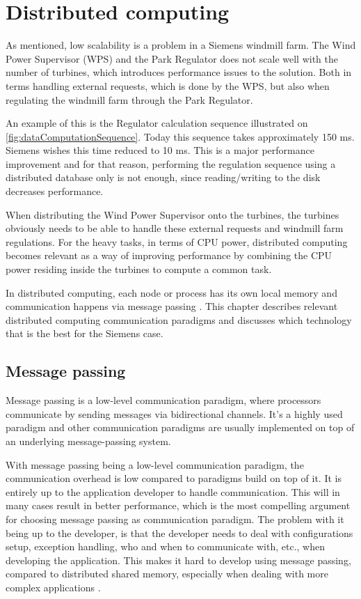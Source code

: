 \chapter{Distributed computing}
As mentioned, low scalability is a problem in a Siemens windmill farm. The Wind Power Supervisor (WPS) and the Park Regulator does not scale well with the number of turbines, which introduces performance issues to the solution. Both in terms handling external requests, which is done by the WPS, but also when regulating the windmill farm through the Park Regulator. 

An example of this is the Regulator calculation sequence illustrated on \cref{fig:dataComputationSequence}. Today this sequence takes approximately 150 ms. Siemens wishes this time reduced to 10 ms. This is a major performance improvement and for that reason, performing the regulation sequence using a distributed database only is not enough, since reading/writing to the disk decreases performance.

When distributing the Wind Power Supervisor onto the turbines, the turbines obviously needs to be able to handle these external requests and windmill farm regulations. For the heavy tasks, in terms of CPU power, distributed computing becomes relevant as a way of improving performance by combining the CPU power residing inside the turbines to compute a common task.

In distributed computing, each node or process has its own local memory and communication happens via message passing \cite{andrews2000foundations}. This chapter describes relevant distributed computing communication paradigms and discusses which technology that is the best for the Siemens case. 


\section{Message passing}

Message passing is a low-level communication paradigm, where processors communicate by sending messages via bidirectional channels. It's a highly used paradigm and other communication paradigms are usually implemented on top of an underlying message-passing system.  

With message passing being a low-level communication paradigm, the communication overhead is low compared to paradigms build on top of it. It is entirely up to the application developer to handle communication. This will in many cases result in better performance, which is the most compelling argument for choosing message passing as communication paradigm. The problem with it being up to the developer, is that the developer needs to deal with configurations setup, exception handling, who and when to communicate with, etc., when developing the application. This makes it hard to develop using message passing, compared to distributed shared memory, especially when dealing with more complex applications \cite{lu1995message}. 

